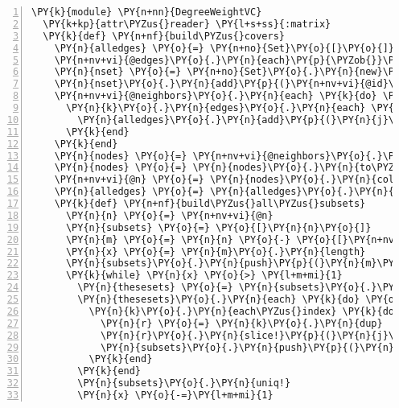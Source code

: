 \begin{Verbatim}[commandchars=\\\{\},numbers=left,firstnumber=1,stepnumber=1,xleftmargin=7mm, fontsize=\small]
\PY{k}{module} \PY{n+nn}{DegreeWeightVC}
  \PY{k+kp}{attr\PYZus{}reader} \PY{l+s+ss}{:matrix}
  \PY{k}{def} \PY{n+nf}{build\PYZus{}covers}
    \PY{n}{alledges} \PY{o}{=} \PY{n+no}{Set}\PY{o}{[}\PY{o}{]}
    \PY{n+nv+vi}{@edges}\PY{o}{.}\PY{n}{each}\PY{p}{\PYZob{}}\PY{o}{|}\PY{n}{k}\PY{o}{|} \PY{n}{alledges}\PY{o}{.}\PY{n}{add}\PY{p}{(}\PY{n}{k}\PY{p}{)}\PY{p}{\PYZcb{}}
    \PY{n}{nset} \PY{o}{=} \PY{n+no}{Set}\PY{o}{.}\PY{n}{new}\PY{p}{(}\PY{n+nv+vi}{@neighbors}\PY{o}{.}\PY{n}{collect}\PY{p}{\PYZob{}}\PY{o}{|}\PY{n}{k}\PY{o}{|} \PY{n}{k}\PY{o}{.}\PY{n}{id}\PY{p}{\PYZcb{}}\PY{p}{)}
    \PY{n}{nset}\PY{o}{.}\PY{n}{add}\PY{p}{(}\PY{n+nv+vi}{@id}\PY{p}{)}
    \PY{n+nv+vi}{@neighbors}\PY{o}{.}\PY{n}{each} \PY{k}{do} \PY{o}{|}\PY{n}{k}\PY{o}{|} 
      \PY{n}{k}\PY{o}{.}\PY{n}{edges}\PY{o}{.}\PY{n}{each} \PY{k}{do} \PY{o}{|}\PY{n}{j}\PY{o}{|} 
        \PY{n}{alledges}\PY{o}{.}\PY{n}{add}\PY{p}{(}\PY{n}{j}\PY{p}{)} \PY{k}{if} \PY{n}{j}\PY{o}{.}\PY{n}{proper\PYZus{}subset?}\PY{p}{(}\PY{n}{nset}\PY{p}{)}
      \PY{k}{end}
    \PY{k}{end}
    \PY{n}{nodes} \PY{o}{=} \PY{n+nv+vi}{@neighbors}\PY{o}{.}\PY{n}{to\PYZus{}set}\PY{o}{.}\PY{n}{add}\PY{p}{(}\PY{n+nb}{self}\PY{p}{)}
    \PY{n}{nodes} \PY{o}{=} \PY{n}{nodes}\PY{o}{.}\PY{n}{to\PYZus{}a}
    \PY{n+nv+vi}{@n} \PY{o}{=} \PY{n}{nodes}\PY{o}{.}\PY{n}{collect}\PY{p}{\PYZob{}}\PY{o}{|}\PY{n}{k}\PY{o}{|} \PY{n}{k}\PY{o}{.}\PY{n}{id}\PY{p}{\PYZcb{}}
    \PY{n}{alledges} \PY{o}{=} \PY{n}{alledges}\PY{o}{.}\PY{n}{to\PYZus{}a}    
    \PY{k}{def} \PY{n+nf}{build\PYZus{}all\PYZus{}subsets}
      \PY{n}{n} \PY{o}{=} \PY{n+nv+vi}{@n}
      \PY{n}{subsets} \PY{o}{=} \PY{o}{[}\PY{n}{n}\PY{o}{]}
      \PY{n}{m} \PY{o}{=} \PY{n}{n} \PY{o}{-} \PY{o}{[}\PY{n+nv+vi}{@id}\PY{o}{]}
      \PY{n}{x} \PY{o}{=} \PY{n}{m}\PY{o}{.}\PY{n}{length}
      \PY{n}{subsets}\PY{o}{.}\PY{n}{push}\PY{p}{(}\PY{n}{m}\PY{p}{)}
      \PY{k}{while} \PY{n}{x} \PY{o}{>} \PY{l+m+mi}{1}
        \PY{n}{thesesets} \PY{o}{=} \PY{n}{subsets}\PY{o}{.}\PY{n}{select}\PY{p}{\PYZob{}}\PY{o}{|}\PY{n}{k}\PY{o}{|} \PY{n}{k}\PY{o}{.}\PY{n}{length} \PY{o}{==} \PY{n}{x}\PY{p}{\PYZcb{}}
        \PY{n}{thesesets}\PY{o}{.}\PY{n}{each} \PY{k}{do} \PY{o}{|}\PY{n}{k}\PY{o}{|}
          \PY{n}{k}\PY{o}{.}\PY{n}{each\PYZus{}index} \PY{k}{do} \PY{o}{|}\PY{n}{j}\PY{o}{|}
            \PY{n}{r} \PY{o}{=} \PY{n}{k}\PY{o}{.}\PY{n}{dup}
            \PY{n}{r}\PY{o}{.}\PY{n}{slice!}\PY{p}{(}\PY{n}{j}\PY{p}{)}
            \PY{n}{subsets}\PY{o}{.}\PY{n}{push}\PY{p}{(}\PY{n}{r}\PY{p}{)}
          \PY{k}{end}
        \PY{k}{end}
        \PY{n}{subsets}\PY{o}{.}\PY{n}{uniq!}
        \PY{n}{x} \PY{o}{-=}\PY{l+m+mi}{1}

\end{Verbatim}
